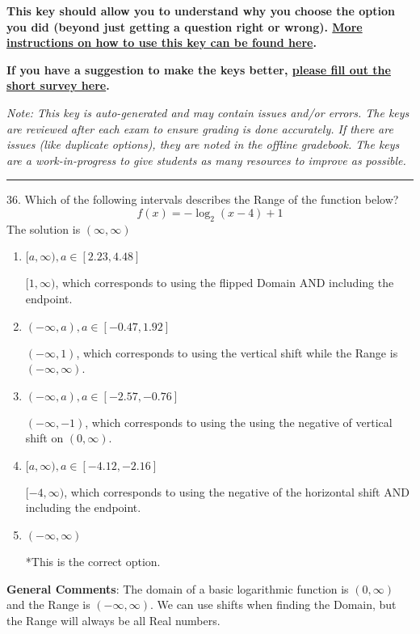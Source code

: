 \documentclass{extbook}[14pt]
\begin{document}
\textbf{This key should allow you to understand why you choose the option you did (beyond just getting a question right or wrong). \href{https://xronos.clas.ufl.edu/mac1105spring2020/courseDescriptionAndMisc/Exams/LearningFromResults}{More instructions on how to use this key can be found here}.}

\textbf{If you have a suggestion to make the keys better, \href{https://forms.gle/CZkbZmPbC9XALEE88}{please fill out the short survey here}.}

\textit{Note: This key is auto-generated and may contain issues and/or errors. The keys are reviewed after each exam to ensure grading is done accurately. If there are issues (like duplicate options), they are noted in the offline gradebook. The keys are a work-in-progress to give students as many resources to improve as possible.}

\rule{\textwidth}{0.4pt}

36. Which of the following intervals describes the Range of the function below?
\[ f(x) = -\log_2{(x-4)}+1 \] 
The solution is $ (\infty, \infty) $ 

\begin{enumerate}[label=\Alph*.] 
\item $ [a, \infty), a \in [2.23, 4.48] $ 

 $[1, \infty)$, which corresponds to using the flipped Domain AND including the endpoint. 
\item $ (-\infty, a), a \in [-0.47, 1.92] $ 

 $(-\infty, 1)$, which corresponds to using the vertical shift while the Range is $(-\infty, \infty)$. 
\item $ (-\infty, a), a \in [-2.57, -0.76] $ 

 $(-\infty, -1)$, which corresponds to using the using the negative of vertical shift on $(0, \infty)$. 
\item $ [a, \infty), a \in [-4.12, -2.16] $ 

 $[-4, \infty)$, which corresponds to using the negative of the horizontal shift AND including the endpoint. 
\item $ (-\infty, \infty) $ 

 *This is the correct option. 
\end{enumerate} 
 
\textbf{General Comments}: The domain of a basic logarithmic function is $(0, \infty)$ and the Range is $(-\infty, \infty)$. We can use shifts when finding the Domain, but the Range will always be all Real numbers.
\end{document}
